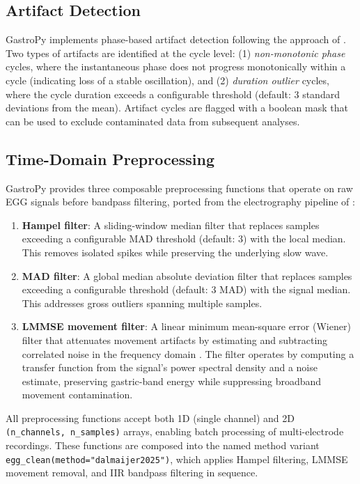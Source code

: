 \documentclass[12pt]{article}
\begin{document}
\subsection{Artifact Detection}

GastroPy implements phase-based artifact detection following the approach of
\citet{Wolpert2020}. Two types of artifacts are identified at the cycle level:
(1) \emph{non-monotonic phase} cycles, where the instantaneous phase does not
progress monotonically within a cycle (indicating loss of a stable oscillation),
and (2) \emph{duration outlier} cycles, where the cycle duration exceeds a
configurable threshold (default: 3 standard deviations from the mean).
Artifact cycles are flagged with a boolean mask that can be used to exclude
contaminated data from subsequent analyses.

\subsection{Time-Domain Preprocessing}

GastroPy provides three composable preprocessing functions that operate on raw
EGG signals before bandpass filtering, ported from the electrography pipeline
of \citet{Anisimova2025}:

\begin{enumerate}
  \item \textbf{Hampel filter}: A sliding-window median filter that replaces
    samples exceeding a configurable MAD threshold (default: 3) with the local
    median. This removes isolated spikes while preserving the underlying slow
    wave.
  \item \textbf{MAD filter}: A global median absolute deviation filter that
    replaces samples exceeding a configurable threshold (default: 3 MAD) with
    the signal median. This addresses gross outliers spanning multiple samples.
  \item \textbf{LMMSE movement filter}: A linear minimum mean-square error
    (Wiener) filter that attenuates movement artifacts by estimating and
    subtracting correlated noise in the frequency domain
    \citep{Gharibans2018}. The filter operates by computing a transfer function
    from the signal's power spectral density and a noise estimate, preserving
    gastric-band energy while suppressing broadband movement contamination.
\end{enumerate}

All preprocessing functions accept both 1D (single channel) and 2D
\texttt{(n\_channels, n\_samples)} arrays, enabling batch processing of
multi-electrode recordings. These functions are composed into the named method
variant \texttt{egg\_clean(method="dalmaijer2025")}, which applies Hampel
filtering, LMMSE movement removal, and IIR bandpass filtering in sequence.
\end{document}
